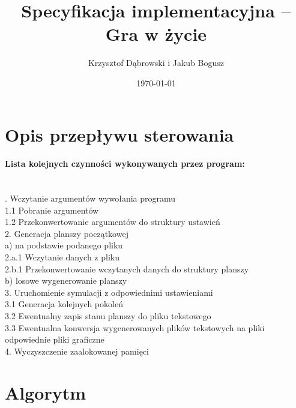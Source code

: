 \documentclass{mwart}
\title{Specyfikacja implementacyjna -- Gra w życie}
\author{Krzysztof Dąbrowski i Jakub Bogusz}
\date{\today}
\begin{document}
\maketitle{}

\tableofcontents{}

\section{Opis przepływu sterowania}

\paragraph{Lista kolejnych czynności wykonywanych przez program:}\mbox{}\\

. Wczytanie argumentów wywołania programu\\
	\hspace*{10mm}1.1 Pobranie argumentów\\
	\hspace*{10mm}1.2 Przekonwertowanie argumentów do struktury ustawień\\
2. Generacja planszy początkowej\\
		\hspace*{10mm}a) na podstawie podanego pliku\\
			\hspace*{20mm}2.a.1 Wczytanie danych z pliku\\
			\hspace*{20mm}2.b.1 Przekonwertowanie wczytanych danych do struktury planszy\\
		\hspace*{10mm}b) losowe wygenerowanie planszy\\
3. Uruchomienie symulacji z odpowiednimi ustawieniami\\
		\hspace*{10mm}3.1 Generacja kolejnych pokoleń\\
		\hspace*{10mm}3.2 Ewentualny zapis stanu planszy do pliku tekstowego\\
		\hspace*{10mm}3.3 Ewentualna konwersja wygenerowanych plików tekstowych na pliki \hspace*{15mm} odpowiednie pliki graficzne\\
4. Wyczyszczenie zaalokowanej pamięci\\

\section{Algorytm}
\end{document}
